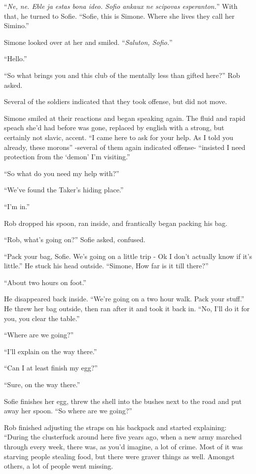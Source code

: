 \documentclass[letterpaper,12pt]{report}
\begin{document}
``\textit{Ne, ne. Eble ja estas bona ideo. Sofio ankaux ne scipovas esperanton.}'' With that, he turned to Sofie. ``Sofie, this is Simone. Where she lives they call her Simino.''

Simone looked over at her and smiled. ``\textit{Saluton, Sofio.}''

``Hello.''

``So what brings you and this club of the mentally less than gifted here?'' Rob asked.

Several of the soldiers indicated that they took offense, but did not move.

Simone smiled at their reactions and began speaking again. The fluid and rapid speach she'd had before was gone, replaced by english with a strong, but certainly not slavic, accent. ``I came here to ask for your help. As I told you already, these morons'' -several of them again indicated offense- ``insisted I need protection from the `demon' I'm visiting.''

``So what do you need my help with?''

``We've found the Taker's hiding place.''

``I'm in.''

Rob dropped his spoon, ran inside, and frantically began packing his bag.

``Rob, what's going on?'' Sofie asked, confused.

``Pack your bag, Sofie. We's going on a little trip - Ok I don't actually know if it's little.'' He stuck his head outside. ``Simone, How far is it till there?''

``About two hours on foot.''

He disappeared back inside. ``We're going on a two hour walk. Pack your stuff.'' He threw her bag outside, then ran after it and took it back in. ``No, I'll do it for you, you clear the table.''

``Where are we going?''

``I'll explain on the way there.''

``Can I at least finish my egg?''

``Sure, on the way there.''
\act

Sofie finishes her egg, threw the shell into the bushes next to the road and put away her spoon. ``So where are we going?''

Rob finished adjusting the straps on his backpack and started explaining: ``During the clusterfuck around here five years ago, when a new army marched through every week, there was, as you'd imagine, a lot of crime. Most of it was starving people stealing food, but there were graver things as well. Amongst others, a lot of people went missing.
\end{document}
